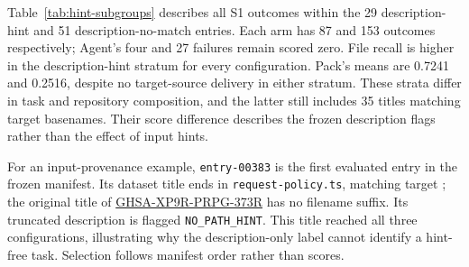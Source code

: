 Table~\ref{tab:hint-subgroups} describes all S1 outcomes within the 29 description-hint and 51 description-no-match entries. Each arm has 87 and 153 outcomes respectively; Agent's four and 27 failures remain scored zero. File recall is higher in the description-hint stratum for every configuration. Pack's means are 0.7241 and 0.2516, despite no target-source delivery in either stratum. These strata differ in task and repository composition, and the latter still includes 35 titles matching target basenames. Their score difference describes the frozen description flags rather than the effect of input hints.


For an input-provenance example, \texttt{entry-00383} is the first evaluated entry in the frozen manifest. Its dataset title ends in \texttt{request-policy.ts}, matching target ; the original title of \href{https://github.com/advisories/GHSA-xp9r-prpg-373r}{GHSA-XP9R-PRPG-373R} has no filename suffix. Its truncated description is flagged \texttt{NO\_PATH\_HINT}. This title reached all three configurations, illustrating why the description-only label cannot identify a hint-free task. Selection follows manifest order rather than scores.
